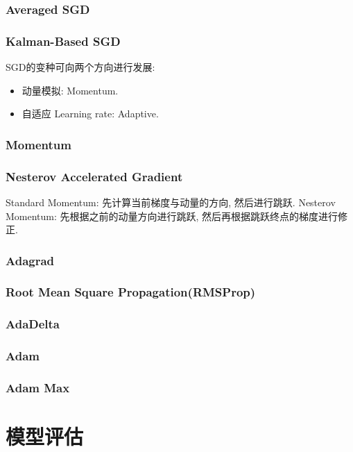 \documentclass[oneside]{book}
\begin{document}
			\subsection{Averaged SGD}
			\subsection{Kalman-Based SGD}
			SGD的变种可向两个方向进行发展:
			\begin{itemize}
				\item 动量模拟: Momentum.
				\item 自适应 Learning rate: Adaptive.
			\end{itemize}
			\subsection{Momentum}
			\subsection{Nesterov Accelerated Gradient \NovaMonoFont{[Momentum]}}
				Standard Momentum: 先计算当前梯度与动量的方向, 然后进行跳跃.
				Nesterov Momentum: 先根据之前的动量方向进行跳跃, 然后再根据跳跃终点的梯度进行修正.
				
			\subsection{Adagrad \NovaMonoFont{[Adaptive]}}
			\subsection{Root Mean Square Propagation(RMSProp) \NovaMonoFont{[Adaptive]}}
			\subsection{AdaDelta \NovaMonoFont{[Adaptive]}}
			\subsection{Adam }
			\subsection{Adam Max }
			
		
		
	\chapter{模型评估}
\end{document}
